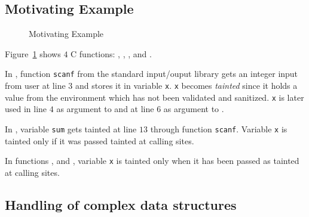 \subsection{Motivating Example}\label{example} 

\begin{figure}[!h]
\begin{center}
\end{center}
\caption{Motivating Example}
\label{fig:sample}
\end{figure}

Figure~\ref{fig:sample} shows $4$ C functions:
\main, \even, \odd, and \compute.

In \main{}, function \texttt{scanf} from the standard input/ouput
library gets an integer input from user at line $3$
and stores it in variable \texttt{x}. \texttt{x} 
becomes \textit{tainted} since it holds a value from
the environment which has not been validated and
sanitized.
\texttt{x} is later used in line $4$ as argument to \even{}
and at line $6$ as argument to \odd{}.

In \compute{}, variable \texttt{sum} gets tainted at
line $13$ through function \texttt{scanf}. Variable
\texttt{x} is tainted only if it was passed tainted
at calling sites.

In functions \even{}, and \odd{}, variable \texttt{x}
is tainted only when it has been passed as tainted
at calling sites.

\begin{comment}
\begin{figure}
\begin{minipage}[b]{0.45\textwidth}
	\begin{tikzpicture}
		\begin{axis}[
					 xlabel=Line of Code,					 
					 symbolic y coords={t,u,p},		
					 ylabel=Variable State,				
					 ytick={t,u,p},
					 xtick={28,29, ...,31},
					 grid=both,
					 width=5cm				 
					 ]				 
			\addplot+ [only marks,
					   nodes near coords=x ] coordinates {
				(28,t)
				(29,p)
				(31,p)
				};
		\end{axis}
	\end{tikzpicture}	
	\caption{Taint Information for \main{}}\label{fig:taintmain}
	\end{minipage}		
	\begin{minipage}[b]{0.45\textwidth}
	\begin{tikzpicture}
		\begin{axis}[
					 xlabel=Line of Code,					 
					 symbolic y coords={t,u,p},		
					 ylabel=Variable State,				
					 ytick={t,u,p},
					 xtick={11,12, ...,18},
					 grid=both,
					 width=5cm				 
					 ]				 
			\addplot+ [only marks,
					   nodes near coords=sum ] coordinates {
				(13,t)
				(17,t)				
				};
		\end{axis}
	\end{tikzpicture}	
	\caption{Taint Information for \compute{}}\label{fig:taintcompute}
	\end{minipage}			
\end{figure}
\end{comment}

\subsection{Handling of complex data structures}

